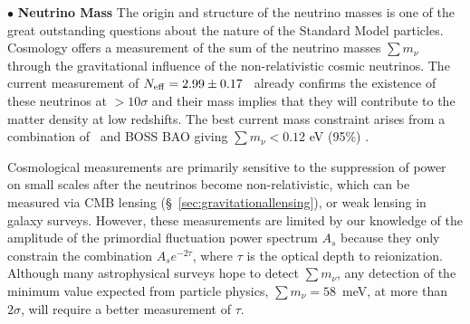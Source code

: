 \documentclass[PICOAPC.tex]{subfiles}
\begin{document}
\noindent$\bullet$ {\bf Neutrino Mass} \hspace{0.1in} \label{neutrino_fundamental} The origin and structure of the neutrino masses is one of the great outstanding  questions about the nature of the Standard Model particles.  
Cosmology offers a  measurement of the sum of the neutrino masses $\sum m_\nu$ through the gravitational influence of the non-relativistic  cosmic neutrinos.  The current measurement of ${N_{\rm eff}} = 2.99 \pm 0.17$~\citep{Planck2018_VI} already confirms the existence of these neutrinos at $>10\sigma$ and their mass implies that they will contribute to the matter density at low redshifts.  The best current mass constraint arises from a combination of  \planck~and BOSS \ac{BAO} giving $\sum m_\nu < 0.12$ eV (95\%) \cite{Planck2018_VI}.

Cosmological measurements are primarily sensitive to the suppression of power on small scales after the neutrinos become non-relativistic, which can be measured via CMB lensing (\S~\ref{sec:gravitationallensing}), or weak lensing in galaxy surveys.  However, these measurements are limited by our knowledge of the amplitude of the primordial fluctuation power spectrum $A_s$ because they only constrain the combination $A_s e^{-2 \tau}$, where $\tau$ is the optical depth to reionization. Although many astrophysical surveys hope to detect $\sum m_\nu$, any detection of the minimum value expected from particle physics, $\sum m_\nu = 58$~meV, at more than $2 \sigma$, will require a better measurement of $\tau$.
\end{document}
